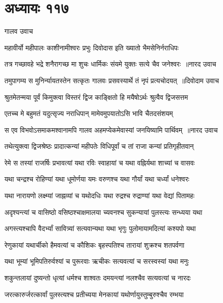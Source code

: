 \chapter{अध्यायः ११७}
\twolineshloka
{गालव उवाच}
{}


\twolineshloka
{महावीर्यो महीपालः काशीनामीश्वरः प्रभुः}
{दिवोदास इति ख्यातो भैमसेनिर्नराधिपः}


\threelineshloka
{तत्र गच्छावहे भद्रे शनैरागच्छ मा शुचः}
{धार्मिकः संयमे युक्तः सत्ये चैव जनेश्वरः ॥नारद उवाच}
{}


\threelineshloka
{तमुपागम्य स मुनिर्न्यायतस्तेन सत्कृतः}
{गालवः प्रसवस्यार्थे तं नृपं प्रत्यचोदयत् ॥दिवोदाम उवाच}
{}


\twolineshloka
{श्रुतमेतन्मया पूर्वं किमुक्त्वा विस्तरं द्विज}
{काङ्क्षितो हि मयैषोऽर्थः श्रुत्वैव द्विजसत्तम}


\twolineshloka
{एतच्च मे बहुमतं यदुत्सृज्य नराधिपान्}
{मामेवमुपयातोऽसि भावि चैतदसंशयम्}


\threelineshloka
{स एव विभवोऽसमाकमश्वानामपि गालव}
{अहमप्येकमेवास्यां जनयिष्यामि पार्थिवम् ॥नारद उवाच}
{}


\twolineshloka
{तथेत्युक्त्वा द्विजश्रेष्ठः प्रादात्कन्यां महीपतेः}
{विधिपूर्वां च तां राजा कन्यां प्रतिगृहीतवान्}


\twolineshloka
{रेमे स तस्यां राजर्षिः प्रभावत्यां यथा रविः}
{स्वाहायां च यथा वह्निर्यथा शाच्यां च वासवः}


\twolineshloka
{यथा चन्द्रश्च रोहिण्यां यथा धूमोर्णया यमः}
{वरुणश्च यथा गौर्यां यथा चर्ध्यां धनेश्वरः}


\twolineshloka
{यथा नारायणो लक्ष्म्यां जाह्नव्यां च यथोदधिः}
{यथा रुद्रश्च रुद्राण्यां यथा वेद्यां पितामहः}


\twolineshloka
{अदृश्यन्त्यां च वासिष्ठो वसिष्ठश्चाक्षमालया}
{च्यवनश्च सुकन्यायां पुलस्त्यः सन्ध्यया यथा}


\twolineshloka
{अगस्त्यश्चापि वैदर्भ्यां सावित्र्यां सत्यवान्यथा}
{यथा भृगुः पुलोमायामदित्यां कश्यपो यथा}


\twolineshloka
{रेणुकायां यथार्चीको हैमवत्यां च कौशिकः}
{बृहस्पतिश्च तारायां शुक्रश्च शतपर्वणा}


\twolineshloka
{यथा भूम्यां भूमिपतिरुर्वश्यां च पुरूरवाः}
{ऋचीकः सत्यवत्यां च सरस्वस्यां यथा मनुः}


\twolineshloka
{शकुन्तलायां दुष्यन्तो धृत्यां धर्मश्च शाश्वतः}
{दमयन्त्यां नलश्चैव सत्यवत्यां च नारदः}


\twolineshloka
{जरत्कारुर्जरत्कार्वां पुलस्त्यश्च प्रतीच्यया}
{मेनकायां यथोर्णायुस्तुम्बुरुश्चैव रम्भया}


